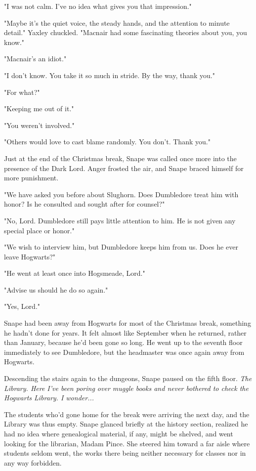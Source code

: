 \documentclass[a4paper,11pt]{article}
\begin{document}
"I was not calm. I've no idea what gives you that impression."

"Maybe it's the quiet voice, the steady hands, and the attention to minute detail." Yaxley chuckled. "Macnair had some fascinating theories about you, you know."

"Macnair's an idiot."

"I don't know. You take it so much in stride. By the way, thank you."

"For what?"

"Keeping me out of it."

"You weren't involved."

"Others would love to cast blame randomly. You don't. Thank you."

Just at the end of the Christmas break, Snape was called once more into the presence of the Dark Lord. Anger frosted the air, and Snape braced himself for more punishment.

"We have asked you before about Slughorn. Does Dumbledore treat him with honor? Is he consulted and sought after for counsel?"

"No, Lord. Dumbledore still pays little attention to him. He is not given any special place or honor."

"We wish to interview him, but Dumbledore keeps him from us. Does he ever leave Hogwarts?"

"He went at least once into Hogsmeade, Lord."

"Advise us should he do so again."

"Yes, Lord."

Snape had been away from Hogwarts for most of the Christmas break, something he hadn't done for years. It felt almost like September when he returned, rather than January, because he'd been gone so long. He went up to the seventh floor immediately to see Dumbledore, but the headmaster was once again away from Hogwarts.

Descending the stairs again to the dungeons, Snape paused on the fifth floor. \emph{The Library. Here I've been poring over muggle books and never bothered to check the Hogwarts Library. I wonder...}

The students who'd gone home for the break were arriving the next day, and the Library was thus empty. Snape glanced briefly at the history section, realized he had no idea where genealogical material, if any, might be shelved, and went looking for the librarian, Madam Pince. She steered him toward a far aisle where students seldom went, the works there being neither necessary for classes nor in any way forbidden.
\end{document}
